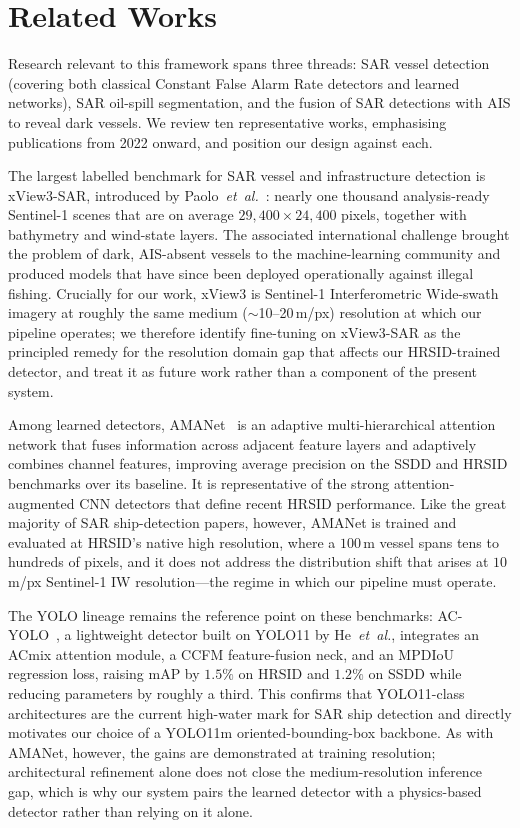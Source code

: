 \documentclass{ieeeaccess}
\begin{document}
\section{Related Works}

Research relevant to this framework spans three threads: SAR vessel detection (covering both classical Constant False Alarm Rate detectors and learned networks), SAR oil-spill segmentation, and the fusion of SAR detections with AIS to reveal dark vessels. We review ten representative works, emphasising publications from 2022 onward, and position our design against each.

The largest labelled benchmark for SAR vessel and infrastructure detection is xView3-SAR, introduced by Paolo~\textit{et~al.}~\cite{7}: nearly one thousand analysis-ready Sentinel-1 scenes that are on average $29{,}400\times24{,}400$ pixels, together with bathymetry and wind-state layers. The associated international challenge brought the problem of dark, AIS-absent vessels to the machine-learning community and produced models that have since been deployed operationally against illegal fishing. Crucially for our work, xView3 is Sentinel-1 Interferometric Wide-swath imagery at roughly the same medium ($\sim$10--20\,m/px) resolution at which our pipeline operates; we therefore identify fine-tuning on xView3-SAR as the principled remedy for the resolution domain gap that affects our HRSID-trained detector, and treat it as future work rather than a component of the present system.

Among learned detectors, AMANet~\cite{8} is an adaptive multi-hierarchical attention network that fuses information across adjacent feature layers and adaptively combines channel features, improving average precision on the SSDD and HRSID benchmarks over its baseline. It is representative of the strong attention-augmented CNN detectors that define recent HRSID performance. Like the great majority of SAR ship-detection papers, however, AMANet is trained and evaluated at HRSID's native high resolution, where a $100$\,m vessel spans tens to hundreds of pixels, and it does not address the distribution shift that arises at $10$\,m/px Sentinel-1 IW resolution---the regime in which our pipeline must operate.

The YOLO lineage remains the reference point on these benchmarks: AC-YOLO~\cite{9}, a lightweight detector built on YOLO11 by He~\textit{et~al.}, integrates an ACmix attention module, a CCFM feature-fusion neck, and an MPDIoU regression loss, raising mAP by $1.5\%$ on HRSID and $1.2\%$ on SSDD while reducing parameters by roughly a third. This confirms that YOLO11-class architectures are the current high-water mark for SAR ship detection and directly motivates our choice of a YOLO11m oriented-bounding-box backbone. As with AMANet, however, the gains are demonstrated at training resolution; architectural refinement alone does not close the medium-resolution inference gap, which is why our system pairs the learned detector with a physics-based detector rather than relying on it alone.
\end{document}
